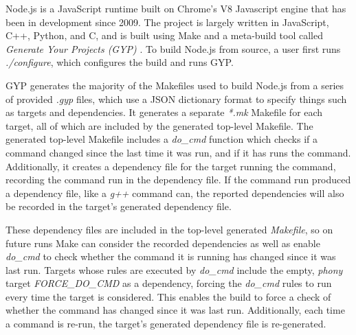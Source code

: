 
Node.js is a JavaScript runtime built on Chrome's V8 Javascript engine that has been in development since 2009.  The project is largely written in JavaScript, C++, Python, and C, and is built using Make and a meta-build tool called \emph{Generate Your Projects (GYP)} \cite{gyp}.  To build Node.js from source, a user first runs \emph{./configure}, which configures the build and runs GYP.

GYP generates the majority of the Makefiles used to build Node.js from a series of provided \emph{.gyp} files, which use a JSON dictionary format to specify things such as targets and dependencies.
It generates a separate \emph{*.mk} Makefile for each target, all of which are included by the generated top-level Makefile.  The generated top-level Makefile includes a \emph{do\_cmd} function which checks if a command changed since the last time it was run, and if it has runs the command.  Additionally, it creates a dependency file for the target running the command, recording the command run in the dependency file.  If the command run produced a dependency file, like a \emph{g++} command can, the reported dependencies will also be recorded in the target's generated dependency file.

These dependency files are included in the top-level generated \emph{Makefile}, so on future runs Make can consider the recorded dependencies as well as enable \emph{do\_cmd} to check whether the command it is running has changed since it was last run.  Targets whose rules are executed by \emph{do\_cmd} include the empty, \emph{phony} target \emph{FORCE\_DO\_CMD} as a dependency, forcing the \emph{do\_cmd} rules to run every time the target is considered.  This enables the build to force a check of whether the command has changed since it was last run.  Additionally, each time a command is re-run, the target's generated dependency file is re-generated.

